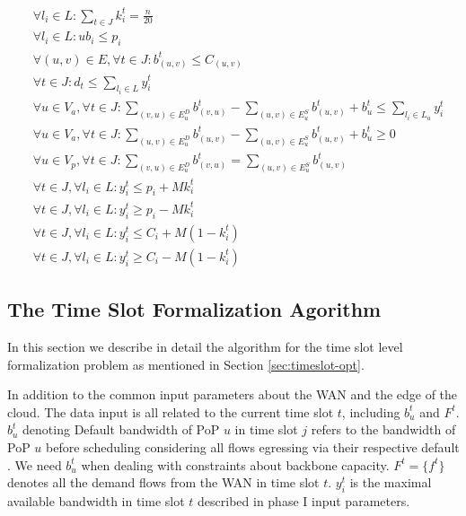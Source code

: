 \begin{algorithm}
\begin{algorithmic}
		\renewcommand{\algorithmicensure}{ \textbf{Subject to:}}
		\ENSURE
     \begin{subequations}
        \begin{align}
            & \forall l_i \in L : \sum_{t \in J} k_{i}^t=\frac{n}{20}  \label{eq:11} \\
            & \forall l_i \in L : ub_i \leq p_i \label{eq:12} \\
            & \forall(u, v)\in E,\forall t \in J : b_{(u, v)}^t \leq C_{(u, v)} \label{eq:13} \\
            & \forall t \in J : d_t \leq \sum_{l_i \in L} y_i^t  \label{eq:14} \\
            & \forall u \in V_a, \forall t \in J  : \sum_{(v, u) \in E_u^D} b_{(v, u)}^t-\sum_{(u, v) \in E_u^S} b_{(u, v)}^t + b_u^t \leq \sum_{l_i \in L_u} y_i^t   \label{eq:15} \\
            & \forall u \in V_a, \forall t \in J  : \sum_{(u, v) \in E_u^D} b_{(u, v)}^t-\sum_{(u, v) \in E_u^S} b_{(u, v)}^t + b_u^t \geq 0   \label{eq:16}  \\
            & \forall u \in V_p,\forall t \in J : \sum_{(v, u) \in E_u^D} b_{(v, u)}^t=\sum_{(u, v) \in E_u^S} b_{(u, v)}^t   \label{eq:17}  \\
            & \forall t \in J, \forall l_i \in L : y_i^t \leq p_i+M k_{i}^t \label{eq:18} \\
            & \forall t \in J, \forall l_i \in L : y_i^t \geq p_i-M k_{i}^t \label{eq:19} \\
            & \forall t \in J, \forall l_i \in L : y_i^t \leq C_i+M\left(1-k_{i}^t\right)  \label{eq:110}  \\
            & \forall t \in J, \forall l_i \in L : y_i^t \geq C_i-M\left(1-k_{i}^t\right) \label{eq:111}
        \end{align}
    \end{subequations}
	\end{algorithmic}
\end{algorithm}

\subsection{The Time Slot Formalization Agorithm}
In this section we describe in detail the algorithm for the time slot level formalization problem as mentioned in Section \ref{sec:timeslot-opt}.

{In addition to the common input parameters about the WAN and the edge of the cloud. The data input is all related to the current time slot $t$, including $b^t_{u}$ and $F^t$. $b^t_{u}$ denoting Default bandwidth of PoP $u$ in time slot $j$ refers to the bandwidth of PoP $u$ before scheduling considering all flows egressing via their respective default {\egress}. We need $b^t_{u}$ when dealing with constraints about backbone capacity. $F^t=\{f^t\}$ denotes all the demand flows from the WAN in time slot $t$. $y^t_i$ is the maximal available bandwidth in time slot $t$ described in phase I input parameters.}



